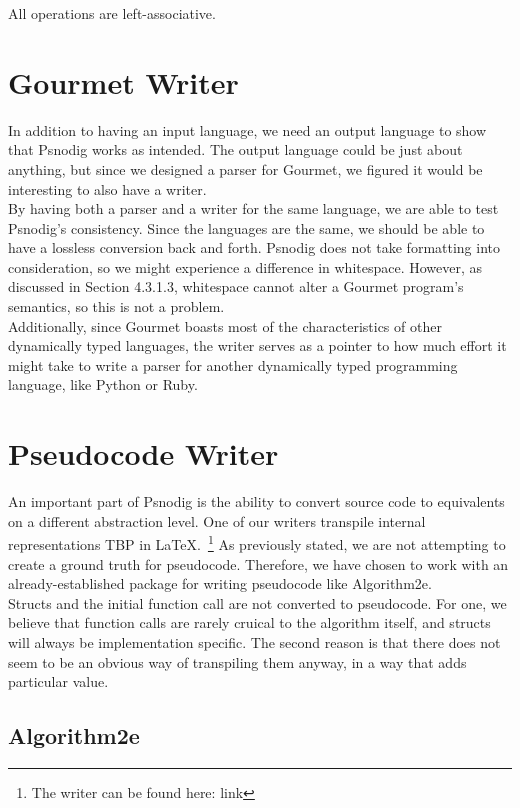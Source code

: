 All operations are left-associative.

\section{Gourmet Writer}

In addition to having an input language, we need an output language to show that Psnodig works as intended. The output language could be just about anything, but since we designed a parser for Gourmet, we figured it would be interesting to also have a writer. \\

By having both a parser and a writer for the same language, we are able to test Psnodig's consistency. Since the languages are the same, we should be able to have a lossless conversion back and forth. Psnodig does not take formatting into consideration, so we might experience a difference in whitespace. However, as discussed in Section 4.3.1.3, whitespace cannot alter a Gourmet program's semantics, so this is not a problem. \\

Additionally, since Gourmet boasts most of the characteristics of other dynamically typed languages, the writer serves as a pointer to how much effort it might take to write a parser for another dynamically typed programming language, like Python or Ruby.

\section{Pseudocode Writer}

An important part of Psnodig is the ability to convert source code to equivalents on a different abstraction level. One of our writers transpile internal representations TBP in LaTeX.~\footnote{The writer can be found here: link} As previously stated, we are not attempting to create a ground truth for pseudocode. Therefore, we have chosen to work with an already-established package for writing pseudocode like Algorithm2e. \\

Structs and the initial function call are not converted to pseudocode. For one, we believe that function calls are rarely cruical to the algorithm itself, and structs will always be implementation specific. The second reason is that there does not seem to be an obvious way of transpiling them anyway, in a way that adds particular value.

\subsection{Algorithm2e}

